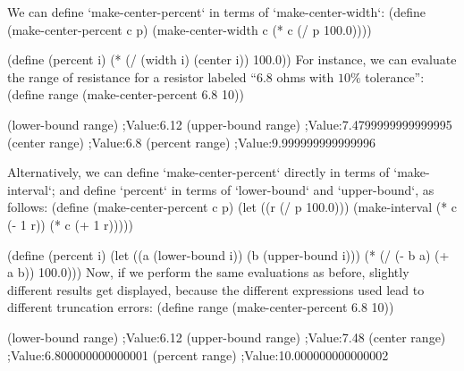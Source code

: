 We can define `make-center-percent` in terms of `make-center-width`:
\begtt\scm
(define (make-center-percent c p)
  (make-center-width c (* c (/ p 100.0))))

(define (percent i)
  (* (/ (width i) (center i)) 100.0))
\endtt
For instance, we can evaluate the range of resistance for a resistor labeled “$6.8$ ohms with $10\%$ tolerance”:
\begtt\scm
(define range (make-center-percent 6.8 10))

(lower-bound range)
;Value:6.12
(upper-bound range)
;Value:7.4799999999999995
(center range)
;Value:6.8
(percent range)
;Value:9.999999999999996
\endtt

Alternatively, we can define `make-center-percent` directly in terms of `make-interval`; and define `percent` in terms of `lower-bound` and `upper-bound`, as follows:
\begtt\scm
(define (make-center-percent c p)
  (let ((r (/ p 100.0)))
    (make-interval (* c (- 1  r)) (* c (+ 1  r)))))

(define (percent i)
  (let ((a (lower-bound i))
        (b (upper-bound i)))
    (* (/ (- b a) (+ a b)) 100.0)))
\endtt
Now, if we perform the same evaluations as before, slightly different results get displayed, because the different expressions used lead to different truncation errors:
\begtt\scm
(define range (make-center-percent 6.8 10))

(lower-bound range)
;Value:6.12
(upper-bound range)
;Value:7.48
(center range)
;Value:6.800000000000001
(percent range)
;Value:10.000000000000002
\endtt
